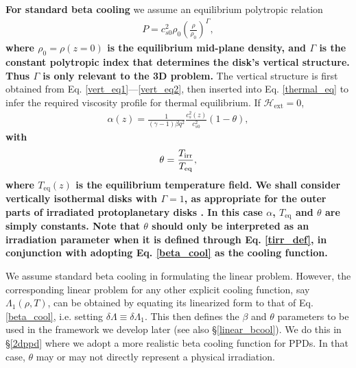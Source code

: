 {\bf For standard beta cooling} we assume an 
equilibrium polytropic relation 
\begin{align}\label{poly_vert} 
  P  =
c_{s0}^2\rho_0\left(\frac{\rho}{\rho_0}\right)^\Gamma,
\end{align}
{\bf where $\rho_0 = \rho(z=0)$ is the equilibrium mid-plane density, and    
$\Gamma$ is the constant polytropic index that determines the disk's
  vertical structure. Thus $\Gamma$ is only relevant to the 3D
  problem.}     
The vertical structure is first obtained from 
Eq. \ref{vert_eq1}---\ref{vert_eq2}, %
then inserted into 
Eq. \ref{thermal_eq} to infer the required viscosity profile for
thermal equilibrium. If  $\mathcal{H}_\mathrm{ext}=0$, 
\begin{align}\label{alpha_beta_relation}
\alpha(z) = \frac{1}{(\gamma-1)\beta
   q^2}\frac{c_s^2(z)}{c_{s0}^2}\left(1 - \theta\right),
\end{align} 
{\bf with 
  \begin{align}\label{tirr_def}
    \theta = \frac{T_\mathrm{irr}}{T_\mathrm{eq}},
  \end{align}
   where $T_\mathrm{eq}(z)$ is the equilibrium temperature field.
   We shall consider vertically isothermal disks with $\Gamma=1$, as
  appropriate for the outer parts of irradiated protoplanetary disks
   \citep{chiang97}. In this case  
   $\alpha$, $T_\mathrm{eq}$ and $\theta$ are simply constants. 
    Note that $\theta$  
    should only be interpreted as an irradiation parameter when it is 
    defined through Eq. \ref{tirr_def}, in conjunction with adopting  
    Eq. \ref{beta_cool} as the cooling function. 
 } 




We assume standard beta cooling in formulating the linear
problem. However, the corresponding linear problem for  
any other explicit cooling function, say $\Lambda_1(\rho,T)$, can be  
obtained by equating its linearized form to 
that of Eq. \ref{beta_cool}, i.e. setting $\delta \Lambda \equiv
\delta \Lambda_1$. This then defines the $\beta$ and $\theta$
parameters to be used in the framework we develop later (see also 
\S\ref{linear_bcool}). We do this in \S\ref{2dppd} where we adopt a  
more realistic beta cooling function for PPDs. In that case, $\theta$ 
may or may not directly represent a physical irradiation.     

